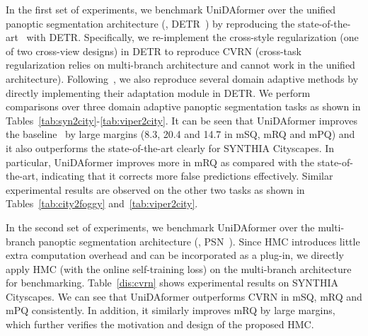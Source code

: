 \documentclass[10pt,twocolumn,letterpaper]{article}
\begin{document}
In the first set of experiments, we benchmark UniDAformer over the unified panoptic segmentation architecture (, DETR~\cite{carion2020detr}) by reproducing the state-of-the-art~\cite{huang2021cvrn} with DETR. Specifically, we re-implement the cross-style regularization (one of two cross-view designs) in DETR to reproduce CVRN (cross-task regularization relies on multi-branch architecture and cannot work in the unified architecture). Following~\cite{huang2021cvrn}, we also reproduce several domain adaptive methods by directly implementing their adaptation module in DETR. We perform comparisons over three domain adaptive panoptic segmentation tasks as shown in Tables~\ref{tab:syn2city}-\ref{tab:viper2city}. It can be seen that UniDAformer improves the baseline~\cite{carion2020detr} by large margins (8.3, 20.4 and 14.7 in mSQ, mRQ and mPQ) and it also outperforms the state-of-the-art clearly for SYNTHIA  Cityscapes. In particular, UniDAformer improves more in mRQ as compared with the state-of-the-art, indicating that it corrects more false predictions effectively. Similar experimental results are observed on the other two tasks as shown in Tables~\ref{tab:city2foggy} and~\ref{tab:viper2city}.

In the second set of experiments, we benchmark UniDAformer over the multi-branch panoptic segmentation architecture (, PSN~\cite{kirillov2019panoptic}). Since HMC introduces little extra computation overhead and can be incorporated as a plug-in, we directly apply HMC (with the online self-training loss) on the multi-branch architecture for benchmarking. Table~\ref{dis:cvrn} shows experimental results on SYNTHIA  Cityscapes. We can see that UniDAformer outperforms CVRN in mSQ, mRQ and mPQ consistently. In addition, it similarly improves mRQ by large margins, which further verifies the motivation and design of the proposed HMC.


\renewcommand\arraystretch{1.}
\begin{table}[t]
\centering
\begin{footnotesize}
\end{footnotesize}
\caption{
The calibration order affects domain adaptation performance. The experiments are conducted over task SYNTHIA  Cityscapes. R, S and P denote region-wise calibration, superpixel-wise calibration and pixel-wise calibration, respectively.
}
\label{dis:order}
\end{table}
\end{document}
